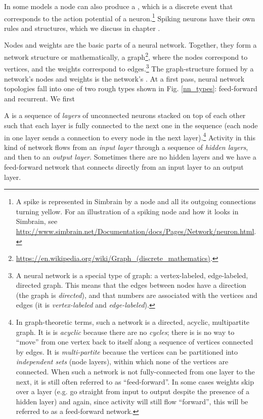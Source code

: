 In some models a node can also produce a , which is a discrete event that corresponds to the action potential of a neuron.\footnote{A spike is represented in Simbrain by a node and all its outgoing connections turning yellow. For an illustration of a spiking node and how it looks in Simbrain, see \url{http://www.simbrain.net/Documentation/docs/Pages/Network/neuron.html}.}  Spiking neurons have their own rules and structures, which we discuss in chapter .

Nodes and weights are the basic parts of a neural network. Together, they form a network structure or mathematically, a graph\footnote{\url{https://en.wikipedia.org/wiki/Graph_(discrete_mathematics)}.}, where the nodes correspond to vertices, and the weights correspond to edges.\footnote{A neural network is a special type of graph: a vertex-labeled, edge-labeled, directed graph. This means that the edges between nodes have a direction (the graph is \emph{directed}), and that numbers are associated with the vertices and edges (it is \emph{vertex-labeled} and \emph{edge-labeled}).}  The graph-structure formed by a network's nodes and weights is the network's . At a first pass, neural network topologies fall into one of two rough types shown in Fig. \ref{nn_types}: feed-forward and recurrent. We first 

A   is a sequence of \emph{layers} of unconnected neurons stacked on top of each other such that each layer is fully connected to the next one in the sequence (each node in one layer sends a connection to every node in the next layer).\footnote{\label{acyclic} In graph-theoretic terms, such a network is a directed, acyclic, multipartite graph. It is is \emph{acyclic} because there are no \emph{cycles}; there is is no way to ``move'' from one vertex back to itself along a sequence of vertices connected by edges. It is \emph{multi-partite} because the vertices can be partitioned into \emph{independent sets} (node layers), within which none of the vertices are connected. When such a network is not fully-connected from one layer to the next, it is still often referred to as ``feed-forward''. In some cases weights skip over a layer (e.g. go straight from input to output despite the presence of a hidden layer) and again, since activity will still flow ``forward'', this will be referred to as a feed-forward network.}  Activity in this kind of network flows from an \emph{input layer} through a sequence of \emph{hidden layers}, and then to an \emph{output layer}. Sometimes there are no hidden layers and we have a feed-forward network that connects directly from an input layer to an output layer.

